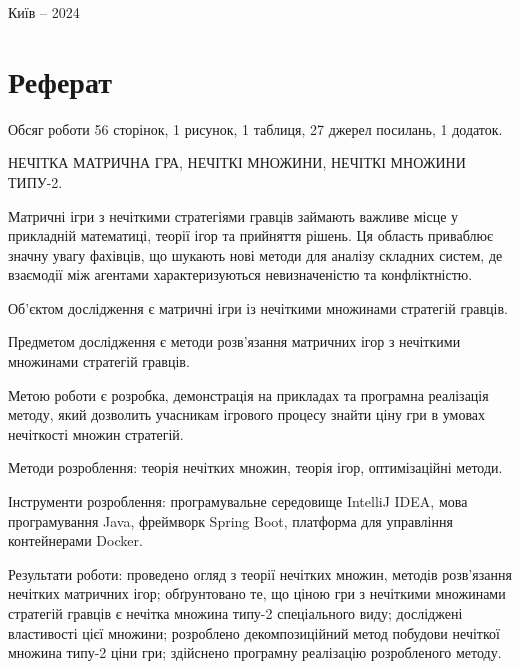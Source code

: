 \documentclass[14pt, a4paper, oneside]{extarticle}
\numberwithin{equation}{section}
\begin{document}
\vfill

\centerline{Київ – 2024}

\section*{Реферат}
Обсяг роботи 56 сторінок, 1 рисунок, 1 таблиця, 27 джерел посилань, 1 додаток. 

НЕЧІТКА МАТРИЧНА ГРА, НЕЧІТКІ МНОЖИНИ, НЕЧІТКІ МНОЖИНИ ТИПУ-2.

Матричні ігри з нечіткими стратегіями гравців займають важливе місце у прикладній математиці, теорії ігор та прийняття рішень. Ця область приваблює значну увагу фахівців, що шукають нові методи для аналізу складних систем, де взаємодії між агентами характеризуються невизначеністю та конфліктністю.

Об'єктом дослідження є матричні ігри із нечіткими множинами стратегій гравців.

Предметом дослідження є методи розв'язання матричних ігор з нечіткими множинами стратегій гравців.

Метою роботи є розробка, демонстрація на прикладах та програмна реалізація методу, який дозволить учасникам ігрового процесу знайти ціну гри в умовах нечіткості множин стратегій. 

Методи розроблення: теорія нечітких множин, теорія ігор, оптимізаційні методи. 

Інструменти розроблення: програмувальне середовище IntelliJ IDEA, мова програмування Java, фреймворк Spring Boot, платформа для управління контейнерами Docker. 

Результати роботи: проведено огляд з теорії нечітких множин, методів розв'язання нечітких матричних ігор; обґрунтовано те, що ціною гри з нечіткими множинами стратегій гравців є нечітка множина типу-2 спеціального виду; досліджені властивості цієї множини; розроблено декомпозиційний метод побудови нечіткої множина типу-2 ціни гри; здійснено програмну реалізацію розробленого методу.


\clearpage
\renewcommand\cftsecdotsep{\cftdot}
\cftsetpnumwidth{9pt}

\renewcommand{\cfttoctitlefont}{\hfill\Large\bfseries\MakeUppercase}
\renewcommand{\cftaftertoctitle}{\hfill}

\renewcommand{\cftsecfont}{\normalfont}
\renewcommand{\cftsecpagefont}{\normalfont}
\renewcommand{\cftsubsecfont}{\normalfont}
\renewcommand{\cftsubsecpagefont}{\normalfont}
\renewcommand{\cftsubsubsecfont}{\normalfont}
\renewcommand{\cftsubsubsecpagefont}{\normalfont}
\end{document}
